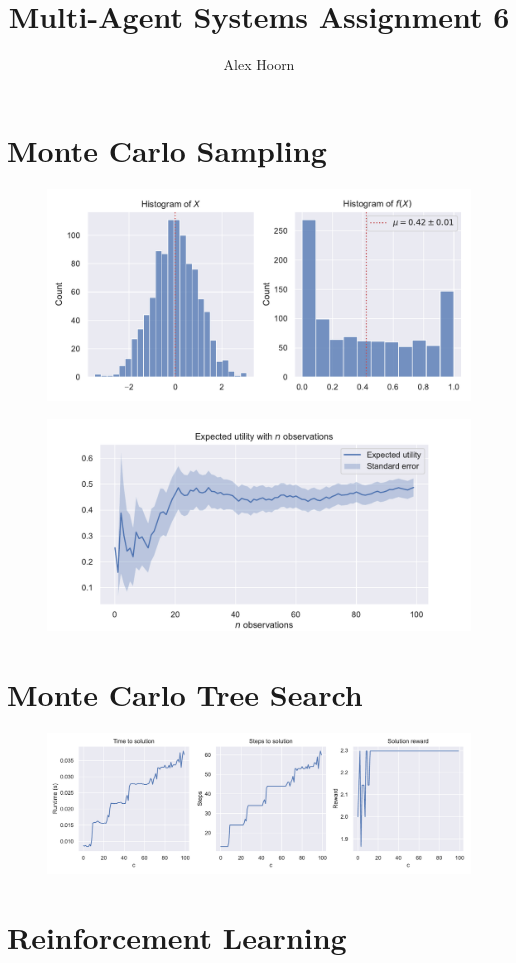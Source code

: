 \documentclass[]{scrartcl}
\title{Multi-Agent Systems Assignment 6}
\author{Alex Hoorn}
\begin{document}
\maketitle

\section{Monte Carlo Sampling}


\begin{figure}[H]
	\centering
	\includegraphics[width=0.7\linewidth]{1-1.pdf}
	\caption{}
	\label{fig:1-1}
\end{figure}


\begin{figure}[H]
	\centering
	\includegraphics[width=0.7\linewidth]{1-2.pdf}
	\caption{}
	\label{fig:1-2}
\end{figure}


\section{Monte Carlo Tree Search}

\begin{figure}[H]
	\centering
	\includegraphics[width=1\linewidth]{2-1.pdf}
	\caption{}
	\label{fig:2-1}
\end{figure}


\section{Reinforcement Learning}
\end{document}
